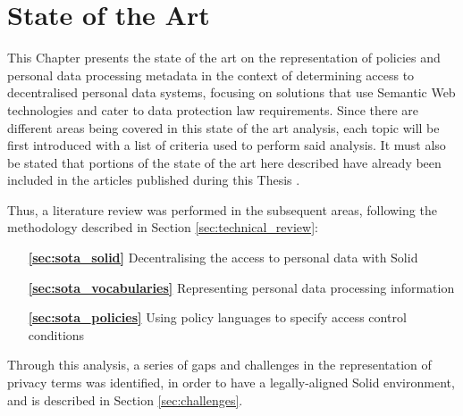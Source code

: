 \chapter{State of the Art}
\label{chap:sota}

This Chapter presents the state of the art on the representation of policies and personal data processing metadata in the context of determining access to decentralised personal data systems, focusing on solutions that use Semantic Web technologies and cater to data protection law requirements.
Since there are different areas being covered in this state of the art analysis, each topic will be first introduced with a list of criteria used to perform said analysis. 
It must also be stated that portions of the state of the art here described have already been included in the articles published during this Thesis \citep{esteves_odrl_2021,esteves_analysis_2022,asgarinia_who_2023,esteves_using_2023}.

Thus, a literature review was performed in the subsequent areas, following the methodology described in Section \ref{sec:technical_review}:

\begin{itemize}
    \item [\textbf{\ref{sec:sota_solid}}] Decentralising the access to personal data with Solid
    \item [\textbf{\ref{sec:sota_vocabularies}}] Representing personal data processing information
    \item [\textbf{\ref{sec:sota_policies}}] Using policy languages to specify access control conditions
\end{itemize}

Through this analysis, a series of gaps and challenges in the representation of privacy terms was identified, in order to have a legally-aligned Solid environment, and is described in Section \ref{sec:challenges}.








